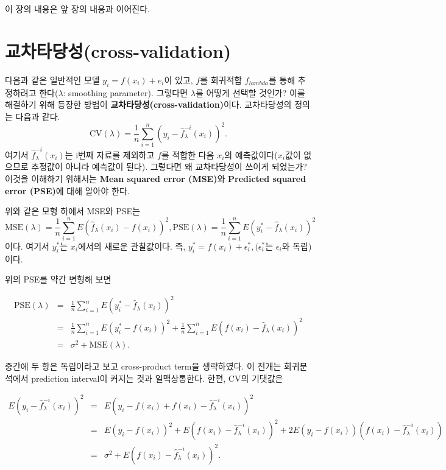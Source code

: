 \documentclass[b5paper,]{scrbook}
\theoremstyle{plain}
\theoremstyle{definition}
\numberwithin{equation}{section}
\begin{document}
이 장의 내용은 앞 장의 내용과 이어진다.

\section{교차타당성(cross-validation)}\label{cross-validation}

다음과 같은 일반적인 모델 \(y_{i}=f(x_{i})+e_{i}\)이 있고, \(f\)를
회귀적합 \(f_{lambda}\)를 통해 추정하려고 한다(\(\lambda\): smoothing
parameter). 그렇다면 \(\lambda\)를 어떻게 선택할 것인가? 이를 해결하기
위해 등장한 방법이 \textbf{교차타당성(cross-validation)}이다.
교차타당성의 정의는 다음과 같다.
\[\text{CV}(\lambda)=\frac{1}{n}\sum_{i=1}^{n}(y_{i}-\hat{f}_{\lambda}^{-i}(x_{i}))^{2}.\]
여기서 \(\hat{f}_{\lambda}^{-i}(x_{i})\)는 i번째 자료를 제외하고 \(f\)를
적합한 다음 \(x_{i}\)의 예측값이다(\(x_{i}\)값이 없으므로 추정값이
아니라 예측값이 된다). 그렇다면 왜 교차타당성이 쓰이게 되었는가? 이것을
이해하기 위해서는 \textbf{Mean squared error (MSE)}와 \textbf{Predicted
squared error (PSE)}에 대해 알아야 한다.

위와 같은 모형 하에서 MSE와 PSE는
\[\text{MSE}(\lambda)=\frac{1}{n}\sum_{i=1}^{n}E(\hat{f}_{\lambda}(x_{i})-f(x_{i}))^{2}, \text{PSE}(\lambda)=\frac{1}{n}\sum_{i=1}^{n}E(y_{i}^{*}-\hat{f}_{\lambda}(x_{i}))^{2}\]
이다. 여기서 \(y_{i}^{*}\)는 \(x_{i}\)에서의 새로운 관찰값이다. 즉,
\(y_{i}^{*}=f(x_{i})+\epsilon_{i}^{*}, (\epsilon_{i}^{*}\)는
\(\epsilon_{i}\)와 독립)이다.

위의 PSE를 약간 변형해 보면

\begin{eqnarray*}
\text{PSE}(\lambda)&=&\frac{1}{n}\sum_{i=1}^{n}E(y_{i}^{*}-\hat{f}_{\lambda}(x_{i}))^{2}\\
&=&\frac{1}{n}\sum_{i=1}^{n}E(y_{i}^{*}-f(x_{i}))^{2}+\frac{1}{n}\sum_{i=1}^{n}E(f(x_{i})-\hat{f}_{\lambda}(x_{i}))^{2}\\
&=&\sigma^{2}+\text{MSE}(\lambda).
\end{eqnarray*}

중간에 두 항은 독립이라고 보고 cross-product term을 생략하였다. 이
전개는 회귀분석에서 prediction interval이 커지는 것과 일맥상통한다.
한편, CV의 기댓값은

\begin{eqnarray*}
E(y_{i}-\hat{f}_{\lambda}^{-i}(x_{i}))^{2}&=&E(y_{i}-f(x_{i})+f(x_{i})-\hat{f}_{\lambda}^{-i}(x_{i}))^{2}\\
&=&E(y_{i}-f(x_{i}))^{2}+E(f(x_{i})-\hat{f}_{\lambda}^{-i}(x_{i}))^{2}+2E(y_{i}-f(x_{i}))(f(x_{i})-\hat{f}_{\lambda}^{-i}(x_{i}))\\
&=&\sigma^{2}+E(f(x_{i})-\hat{f}_{\lambda}^{-i}(x_{i}))^{2}.\\
\end{eqnarray*}
\end{document}

